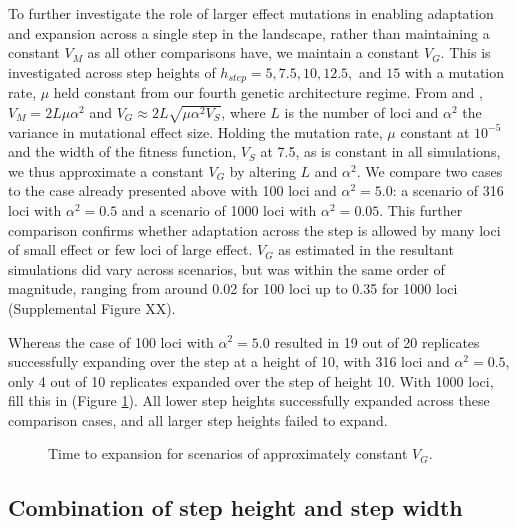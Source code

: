 To further investigate the role of larger effect mutations in enabling adaptation and expansion across a single step in the landscape, rather than maintaining a constant $V_M$ as all other comparisons have, we maintain a constant $V_G$. This is investigated across step heights of $h_{step} = 5, 7.5, 10, 12.5,$ and $15$ with a mutation rate, $\mu$ held constant from our fourth genetic architecture regime. From \citet{Lande:1975} and \citet{Johnson:2005}, $V_M = 2 L \mu \alpha^2$ and $V_G \approx 2 L \sqrt{\mu \alpha^2 V_S}$, where $L$ is the number of loci and $\alpha^2$ the variance in mutational effect size. Holding the mutation rate, $\mu$ constant at $10^{-5}$ and the width of the fitness function, $V_S$ at 7.5, as is constant in all simulations, we thus approximate a constant $V_G$ by altering $L$ and $\alpha^2$. We compare two cases to the case already presented above with 100 loci and $\alpha^2 = 5.0$: a scenario of 316 loci with $\alpha^2 = 0.5$ and a scenario of 1000 loci with $\alpha^2 = 0.05$. This further comparison confirms whether adaptation across the step is allowed by many loci of small effect or few loci of large effect. $V_G$ as estimated in the resultant simulations did vary across scenarios, but was within the same order of magnitude, ranging from around 0.02 for 100 loci up to 0.35 for 1000 loci (Supplemental Figure \color{red}XX\color{black}). 

Whereas the case of 100 loci with $\alpha^2 = 5.0$ resulted in 19 out of 20 replicates successfully expanding over the step at a height of 10, with 316 loci and $\alpha^2 = 0.5$, only 4 out of 10 replicates expanded over the step of height 10. With 1000 loci, \color{red}fill this in\color{black} (Figure \ref{fig:constVG}). %
All lower step heights successfully expanded across these comparison cases, and all larger step heights failed to expand.

\begin{figure}[h]
\centering
{}
\caption[Time to expansion with constant $V_G$.]{Time to expansion for scenarios of approximately constant $V_G$.}
\label{fig:constVG}
\end{figure}


\subsection{Combination of step height and step width}


